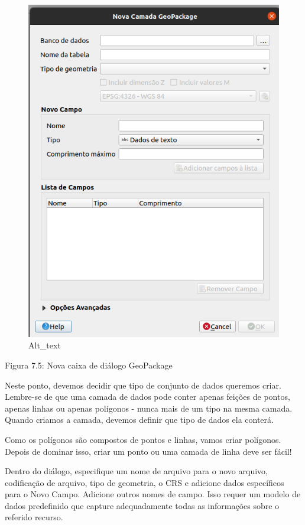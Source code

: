 \documentclass[
]{book}
\begin{document}
\begin{figure}
\centering
\includegraphics{media/modulo7/new-vector.png}
\caption{Alt\_text}
\end{figure}

Figura 7.5: Nova caixa de diálogo GeoPackage

Neste ponto, devemos decidir que tipo de conjunto de dados queremos criar. Lembre-se de que uma camada de dados pode conter apenas feições de pontos, apenas linhas ou apenas polígonos - nunca mais de um tipo na mesma camada. Quando criamos a camada, devemos definir que tipo de dados ela conterá.

Como os polígonos são compostos de pontos e linhas, vamos criar polígonos. Depois de dominar isso, criar um ponto ou uma camada de linha deve ser fácil!

Dentro do diálogo, especifique um nome de arquivo para o novo arquivo, codificação de arquivo, tipo de geometria, o CRS e adicione dados específicos para o Novo Campo. Adicione outros nomes de campo. Isso requer um modelo de dados predefinido que capture adequadamente todas as informações sobre o referido recurso.
\end{document}
